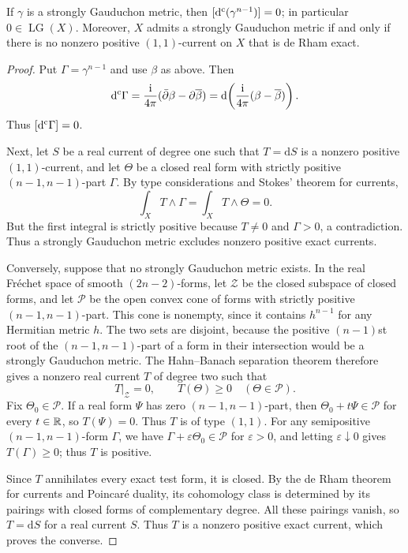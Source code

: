 \begin{proposition}\label{prop:lee-strong-obstruction}
If $\gamma$ is a strongly Gauduchon metric, then $[\mathrm d^{\mathrm c}(\gamma^{n-1})]=0$; in particular $0\in\operatorname{LG}(X)$. Moreover, $X$ admits a strongly Gauduchon metric if and only if there is no nonzero positive $(1,1)$-current on $X$ that is de Rham exact.
\end{proposition}
\begin{proof}
Put $\Gamma=\gamma^{n-1}$ and use $\beta$ as above. Then
\[
 \mathrm d^{\mathrm c}\Gamma
 =\frac{\mathrm i}{4\pi}
       (\bar\partial\beta-\partial\overline\beta)
 =\mathrm{d}\!\left(\frac{\mathrm i}{4\pi}
                              (\beta-\overline\beta)\right).
\]
Thus $[\mathrm d^{\mathrm c}\Gamma]=0$.

Next, let $S$ be a real current of degree one such that $T=\mathrm{d}S$ is a nonzero positive $(1,1)$-current, and let $\Theta$ be a closed real form with strictly positive $(n-1,n-1)$-part $\Gamma$. By type considerations and Stokes' theorem for currents,
\[
 \int_XT\wedge\Gamma
 =\int_XT\wedge\Theta=0.
\]
But the first integral is strictly positive because $T\ne0$ and $\Gamma>0$, a contradiction. Thus a strongly Gauduchon metric excludes nonzero positive exact currents.

Conversely, suppose that no strongly Gauduchon metric exists. In the real Fr\'echet space of smooth $(2n-2)$-forms, let $\mathcal Z$ be the closed subspace of closed forms, and let $\mathcal P$ be the open convex cone of forms with strictly positive $(n-1,n-1)$-part. This cone is nonempty, since it contains $h^{n-1}$ for any Hermitian metric $h$. The two sets are disjoint, because the positive $(n-1)$st root of the $(n-1,n-1)$-part of a form in their intersection would be a strongly Gauduchon metric. The Hahn--Banach separation theorem therefore gives a nonzero real current $T$ of degree two such that
\[
 T|_{\mathcal Z}=0,\qquad T(\Theta)\geq0\quad(\Theta\in\mathcal P).
\]
Fix $\Theta_0\in\mathcal P$. If a real form $\Psi$ has zero $(n-1,n-1)$-part, then $\Theta_0+t\Psi\in\mathcal P$ for every $t\in\mathbb R$, so $T(\Psi)=0$. Thus $T$ is of type $(1,1)$. For any semipositive $(n-1,n-1)$-form $\Gamma$, we have $\Gamma+\varepsilon\Theta_0\in\mathcal P$ for $\varepsilon>0$, and letting $\varepsilon\downarrow0$ gives $T(\Gamma)\geq0$; thus $T$ is positive.

Since $T$ annihilates every exact test form, it is closed. By the de Rham theorem for currents and Poincar\'e duality, its cohomology class is determined by its pairings with closed forms of complementary degree. All these pairings vanish, so $T=\mathrm{d}S$ for a real current $S$. Thus $T$ is a nonzero positive exact current, which proves the converse.
\end{proof}

